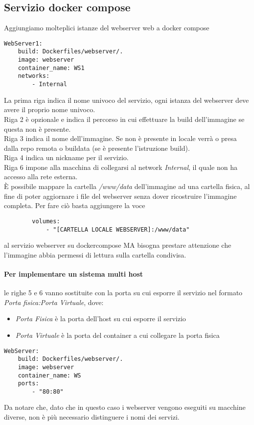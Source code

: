 \documentclass[../DocumentazioneProgetto.tex]{subfiles}
\begin{document}
	\subsection{Servizio docker compose} 
	\label{sec:WebserverDockerCompose}
	Aggiungiamo molteplici istanze del webserver web a docker compose
	\begin{lstlisting}[caption=Webserver Docker Compose] 
WebServer1:
	build: Dockerfiles/webserver/.
	image: webserver
	container_name: WS1
	networks:
		- Internal\end{lstlisting}
	La prima riga indica il nome univoco del servizio, ogni istanza del webserver deve avere il proprio nome univoco.\\
	Riga 2 è opzionale e indica il percorso in cui effettuare la build dell'immagine se questa non è presente.\\
	Riga 3 indica il nome dell'immagine. Se non è presente in locale verrà o presa dalla repo remota o buildata (se è presente l'istruzione build).\\
	Riga 4 indica un nickname per il servizio.\\
	Riga 6 impone alla macchina di collegarsi al network \textit{Internal}, il quale non ha accesso alla rete esterna.\\
	È possibile mappare la cartella \textit{/www/data} dell'immagine ad una cartella fisica, al fine di poter aggiornare i file del webserver senza dover ricostruire l'immagine completa.
	Per fare ciò basta aggiungere la voce
	\begin{lstlisting} 
		volumes:
            - "[CARTELLA LOCALE WEBSERVER]:/www/data"\end{lstlisting} 
	al servizio webserver su dockercompose MA bisogna prestare attenzione che l'immagine abbia permessi di lettura sulla cartella condivisa.
	\paragraph{Per implementare un sistema multi host} le righe 5 e 6 vanno sostituite con la porta su cui esporre il servizio nel formato \textit{Porta fisica:Porta Virtuale}, 
	dove:
	\begin{itemize}
		\item \textit{Porta Fisica} è la porta dell'host su cui esporre il servizio
		\item \textit{Porta Virtuale} è la porta del container a cui collegare la porta fisica 
	\end{itemize}
	\begin{lstlisting}[caption=Webserver Docker Compose in multi host] 
WebServer:
	build: Dockerfiles/webserver/.
	image: webserver
	container_name: WS
	ports:
		- "80:80"\end{lstlisting}
	Da notare che, dato che in questo caso i webserver vengono eseguiti su macchine diverse, non è più necessario distinguere i nomi dei servizi.
\end{document}
